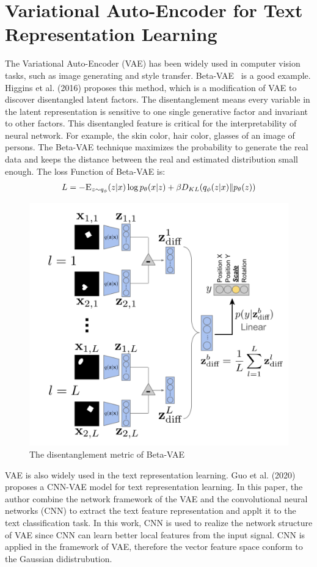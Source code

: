 \documentclass{article}
\begin{document}
\section{Variational Auto-Encoder for Text Representation Learning}
The Variational Auto-Encoder (VAE) has been widely used in computer vision tasks, such as image generating and style transfer. Beta-VAE~\cite{higgins2016beta} is a good example. Higgins et al. (2016) proposes this method, which is a modification of VAE to discover disentangled latent factors. The disentanglement means every variable in the latent representation is sensitive to one single generative factor and invariant to other factors. This disentangled feature is critical for the interpretability of neural network. For example, the skin color, hair color, glasses of an image of persons. The Beta-VAE technique maximizes the probability to generate the real data and keeps the distance between the real and estimated distribution small enough. The loss Function of Beta-VAE is:
\begin{equation}
	L=-\textsc{E}_{z\sim q_{\phi}}(z|x)\log p_{\theta}(x|z) + \beta D_{KL}(q_\phi(z|x)\|p_\theta(z))
\end{equation}

\begin{figure}[ht]
  \centering
  \includegraphics[width = 0.56\linewidth]{figures/betavae.png}
  \caption{The disentanglement metric of Beta-VAE}
  \label{fig::Beta-VAE}
\end{figure}

VAE is also widely used in the text representation learning. Guo et al. (2020)~\cite{10.1007/978-3-030-60029-7_21} proposes a CNN-VAE model for text representation learning. In this paper, the author combine the network framework of the VAE and the convolutional neural networks (CNN) to extract the text feature representation and applt it to the text classification task. In this work, CNN is used to realize the network structure of VAE since CNN can learn better local features from the input signal. CNN is applied in the framework of VAE, therefore the vector feature space conform to the Gaussian didistrubution.
\end{document}

